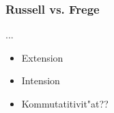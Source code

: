 \documentclass[]{scrartcl}
\begin{document}
\subsubsection{Russell vs. Frege}

...

\begin{itemize}
  \item Extension
  \item Intension
  \item Kommutatitivit"at??
\end{itemize}

\newpage
%
%

\end{document}
